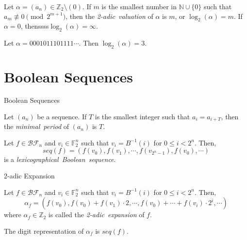 \documentclass{beamer}
\def\zzz{\mathbb{Z}}
\def\gftwo{\mathbb{F}_2}
\def\nnn{\mathbb{N}}
\def\BF{\mathcal{BF}}
\def\an{(a_n)}
\begin{document}
\begin{frame}
  \begin{definition}
    Let $\alpha=\an\in\zzz_2\setminus(0)$. If $m$ is the smallest number in
    $\nnn\cup\{0\}$ such that $a_m \not\equiv 0 \pmod 2^{m+1}$, then the {\em
    2-adic\ valuation} of $\alpha$ is $m$, or $\log_2(\alpha)=m$. If $\alpha=0$,
    thenssss$\log_2(\alpha)=\infty$.
  \end{definition}
  \begin{example}
    Let $\alpha=0001011101111\cdots$. Then $\log_2(\alpha)=3$.
  \end{example}
\end{frame}

\section{Boolean Sequences}
\begin{frame}{Boolean Sequences}
  \begin{definition}
    Let $(a_n)$ be a sequence. If $T$ is the smallest integer such that
    $a_i=a_{i+T}$, then the {\em minimal\ period} of $(a_n)$ is $T$.
  \end{definition}
  
  \begin{definition}\label{def:lex-Bool-seq}
    Let $f\in\BF_n$ and $v_i\in\gftwo^n$ such that $v_i=B^{-1}(i)$ for
    $0\leq i<2^n$. Then,
    \begin{equation}
      seq(f)=(f(v_0),f(v_1),\cdots,f(v_{2^n-1}),f(v_0),\cdots)
    \end{equation}
    is a {\em lexicographical\ Boolean\ sequence}.
  \end{definition}
\end{frame}

\begin{frame}{2-adic Expansion}
  \begin{definition}\label{2-adic-ex}
    Let $f\in\BF_n$ and $v_i\in\gftwo^n$ such that $v_i=B^{-1}(i)$ for
    $0\leq i<2^n$. Then,
    \begin{equation}
      \alpha_f=(f(v_0),f(v_0)+f(v_1)\cdot2,\cdots,\allowbreak
        f(v_0)+\cdots\allowbreak+f(v_i)\cdot2^i,\allowbreak\cdots)
    \end{equation}
    where $\alpha_f\in\zzz_2$ is called the {\em 2-adic\ expansion} of $f$.
  \end{definition}
  
  \begin{lemma}
    The digit representation of $\alpha_f$ is $seq(f)$.
  \end{lemma}
\end{frame}
\end{document}
